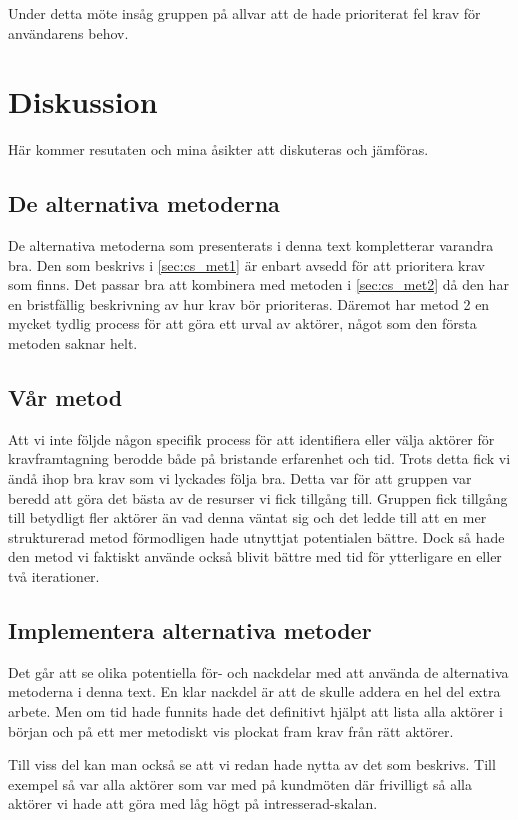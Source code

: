 Under detta möte insåg gruppen på allvar att de hade prioriterat fel krav för användarens behov.


\section{Diskussion}
Här kommer resutaten och mina åsikter att diskuteras och jämföras.

\subsection{De alternativa metoderna}
De alternativa metoderna som presenterats i denna text kompletterar varandra bra. Den som beskrivs i \ref{sec:cs_met1} är enbart avsedd för att prioritera krav som finns. Det passar bra att kombinera med metoden i \ref{sec:cs_met2} då den har en bristfällig beskrivning av hur krav bör prioriteras. Däremot har metod 2 en mycket tydlig process för att göra ett urval av aktörer, något som den första metoden saknar helt.

\subsection{Vår metod}
Att vi inte följde någon specifik process för att identifiera eller välja aktörer för kravframtagning berodde både på bristande erfarenhet och tid. Trots detta fick vi ändå ihop bra krav som vi lyckades följa bra. Detta var för att gruppen var beredd att göra det bästa av de resurser vi fick tillgång till. Gruppen fick tillgång till betydligt fler aktörer än vad denna väntat sig och det ledde till att en mer strukturerad metod förmodligen hade utnyttjat potentialen bättre. Dock så hade den metod vi faktiskt använde också blivit bättre med tid för ytterligare en eller två iterationer.

\subsection{Implementera alternativa metoder}
Det går att se olika potentiella för- och nackdelar med att använda de alternativa metoderna i denna text. En klar nackdel är att de skulle addera en hel del extra arbete. Men om tid hade funnits hade det definitivt hjälpt att lista alla aktörer i början och på ett mer metodiskt vis plockat fram krav från rätt aktörer.

Till viss del kan man också se att vi redan hade nytta av det som beskrivs. Till exempel så var alla aktörer som var med på kundmöten där frivilligt så alla aktörer vi hade att göra med låg högt på intresserad-skalan.

